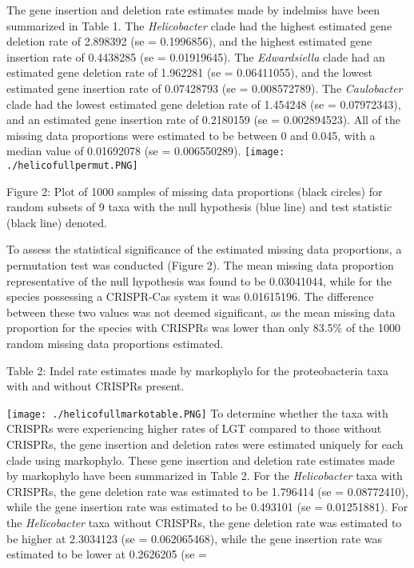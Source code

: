 \documentclass[english]{article}
\begin{document}
The gene insertion and deletion rate estimates made by indelmiss have
been summarized in Table 1. 
The  \textit{Helicobacter}  clade  had  the highest  estimated  
gene deletion rate  of 2.898392 (se = 0.1996856), and  the highest estimated
gene insertion  rate  of 0.4438285 (se = 0.01919645). The
\textit{Edwardsiella}
clade had an estimated gene deletion rate of 1.962281 (se =
0.06411055), and the lowest estimated gene insertion rate of 0.07428793
(se = 0.008572789). The \textit{Caulobacter} clade had the lowest estimated
gene deletion rate of 1.454248 (se = 0.07972343), and an estimated
gene insertion rate of 0.2180159 (se = 0.002894523).  All of the missing
data proportions were estimated to be between 0 and 0.045, with a
median value of 0.01692078 (se = 0.006550289). 
\singlespacing
\texttt{[image: ./helicofullpermut.PNG]}
\caption{Figure 2: Plot of 1000 samples of missing data proportions
(black circles) for random subsets of 9 taxa with the null hypothesis (blue line) 
and test statistic (black line) denoted.} 
\singlespacing
To assess the statistical significance of the estimated missing data
proportions, a permutation test was conducted (Figure 2).  
The mean missing data proportion representative of the null
hypothesis was found to be 0.03041044, while for the species
possessing a CRISPR-Cas system it was 0.01615196. The difference
between these two values was not deemed significant, as the mean
missing data proportion for the species with CRISPRs was lower than
only 83.5\% of the 1000 random missing data proportions estimated.  
\singlespacing
\singlespacing
\singlespacing
\singlespacing
\caption{Table 2: Indel rate estimates made by markophylo for the
proteobacteria taxa with and without CRISPRs present.}
\newline
\texttt{[image: ./helicofullmarkotable.PNG]}
\singlespacing
To determine  whether  the taxa  with CRISPRs  were experiencing
higher rates of LGT compared to those without CRISPRs,  the gene
insertion and deletion rates were estimated uniquely for each clade
using markophylo. These gene insertion and deletion rate estimates
made by markophylo have been summarized in Table 2. For the \textit{Helicobacter} taxa with CRISPRs,  
the gene
deletion rate was estimated  to be 1.796414 (se = 0.08772410), while
the gene insertion rate was estimated to be 0.493101 (se = 0.01251881). For
the \textit{Helicobacter} taxa without  CRISPRs,  the gene deletion rate was
estimated to be higher at 2.3034123 (se = 0.062065468), while the gene
insertion rate was estimated  to be lower at 0.2626205 (se =
\end{document}
